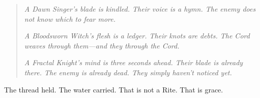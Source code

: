 \begin{quote}
\textit{A Dawn Singer's blade is kindled. Their voice is a hymn. The enemy does not know which to fear more.}

\textit{A Bloodsworn Witch's flesh is a ledger. Their knots are debts. The Cord weaves through them—and they through the Cord.}

\textit{A Fractal Knight's mind is three seconds ahead. Their blade is already there. The enemy is already dead. They simply haven't noticed yet.}
\end{quote}

The thread held. The water carried. That is not a Rite. That is grace.
